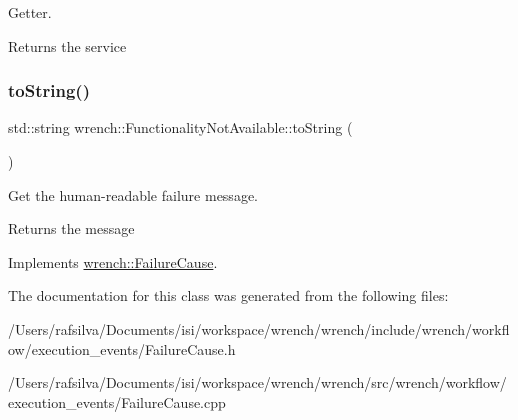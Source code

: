 Getter. 

\begin{DoxyReturn}{Returns}
the service 
\end{DoxyReturn}
\mbox{\label{classwrench_1_1_functionality_not_available_af19ea11f7e3d50d0bea7c8a66b7b1221}} 
\subsubsection{\texorpdfstring{to\+String()}{toString()}}
{\footnotesize\ttfamily std\+::string wrench\+::\+Functionality\+Not\+Available\+::to\+String (\begin{DoxyParamCaption}{ }\end{DoxyParamCaption})\hspace{0.3cm}{\ttfamily [virtual]}}



Get the human-\/readable failure message. 

\begin{DoxyReturn}{Returns}
the message 
\end{DoxyReturn}


Implements \hyperlink{classwrench_1_1_failure_cause_afbad248ebe902409f2cd4f1d6f2b867d}{wrench\+::\+Failure\+Cause}.



The documentation for this class was generated from the following files\+:\begin{DoxyCompactItemize}
\item 
/\+Users/rafsilva/\+Documents/isi/workspace/wrench/wrench/include/wrench/workflow/execution\+\_\+events/Failure\+Cause.\+h\item 
/\+Users/rafsilva/\+Documents/isi/workspace/wrench/wrench/src/wrench/workflow/execution\+\_\+events/Failure\+Cause.\+cpp\end{DoxyCompactItemize}
